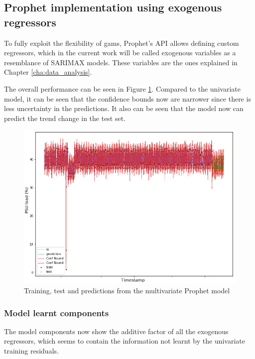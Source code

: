 \subsection{Prophet implementation using exogenous regressors}

To fully exploit the flexibility of \acp{gam}, Prophet's API allows defining custom regressors, which in the current work will be called exogenous variables as a resemblance of SARIMAX models. These variables are the ones explained in Chapter \ref{cha:data_analysis}.

The overall performance can be seen in Figure \ref{fig:prophet_multi_split}. Compared to the univariate model, it can be seen that the confidence bounds now are narrower since there is less uncertainty in the predictions. It also can be seen that the model now can predict the trend change in the test set. 

\begin{figure}[H]
	\centering
	\includegraphics[width=0.8\linewidth]{figures/prophet_multi_split}
	\caption{Training, test and predictions from the multivariate Prophet model}
	\label{fig:prophet_multi_split}
\end{figure}


\subsubsection*{Model learnt components}

The model components now show the additive factor of all the exogenous regressors, which seems to contain the information not learnt by the univariate training residuals. 


%

